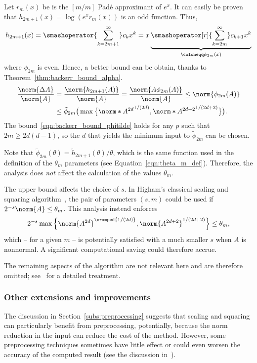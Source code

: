 Let $r_m(x)$ be is the $[m/m]$ Padé approximant of $e^x$. It can easily be proven that $h_{2m+1}(x)=\log(e^xr_m(x))$ is an odd function. Thus,
\[
	h_{2m+1}(x)=\smashoperator{\sum_{k=2m+1}^{\infty}}c_kx^k=x\underbrace{\smashoperator[r]{\sum_{k=2m}^{\infty}}c_{k+1}x^k}_{\coloneqq \phi_{2m}(x)}
\]
where $\phi_{2m}$ is even. Hence, a better bound can be obtain, thanks to Theorem~\ref{thm:backerr_bound_alpha}.
\begin{align}\label{eqn:backerr_bound_phitilde}
	\frac{\norm{\Delta{A}}}{\norm{A}}&=\frac{\norm{h_{2m+1}(A)}}{\norm{A}}=\frac{\norm{A\phi_{2m}(A)}}{\norm{A}}\le\norm{\phi_{2m}(A)}\\
	&\le\tilde{\phi}_{2m}\big(\max\big\{\norm*{A^{2d}}^{1/(2d)}, \norm*{A^{2d+2}}^{1/(2d+2)}\big\}\big).
\end{align}
The bound~\eqref{eqn:backerr_bound_phitilde} holds for any $p$ such that $2m\ge 2d(d-1)$, so the $d$ that yields the minimum input to $\tilde{\phi}_{2m}$ can be chosen.

\begin{oss}
	Note that $\tilde{\phi}_{2m}(\theta)=\tilde{h}_{2m+1}(\theta)/\theta$, which is the same function used in the definition of the $\theta_m$ parameters (see Equation~\eqref{eqn:theta_m_def}). Therefore, the analysis does \emph{not} affect the calculation of the values $\theta_m$. 
\end{oss}

The upper bound affects the choice of $s$. In Higham's classical scaling and squaring algorithm~\cite{higham:SaS_revisited}, the pair of parameters $(s,m)$ could be used if $2^{-s}\norm{A}\le\theta_m$. This analysis instead enforces
\[
	2^{-s}\max\Big\{\norm{A^{2d}}^{\cramped{1/(2d)}}, \norm{A^{2d+2}}^{1/(2d+2)}\Big\}\le\theta_m,
\]
which -- for a given $m$ -- is potentially satisfied with a much smaller $s$ when $A$ is nonnormal. A significant computational saving could therefore accrue.

The remaining aspects of the algorithm are not relevant here and are therefore omitted; see~\cite{higham:alhi09_new} for a detailed treatment.

\subsubsection{Other extensions and improvements}\label{subs:expm_sas_miscellanea}
The discussion in Section~\ref{subs:preprocessing} suggests that scaling and squaring can particularly benefit from preprocessing, potentially, because the norm reduction in the input can reduce the cost of the method. However, some preprocessing techniques sometimes have little effect or could even worsen the accuracy of the computed result (see the discussion in~\cite[§~10.7.3]{higham:matfun_book}).

